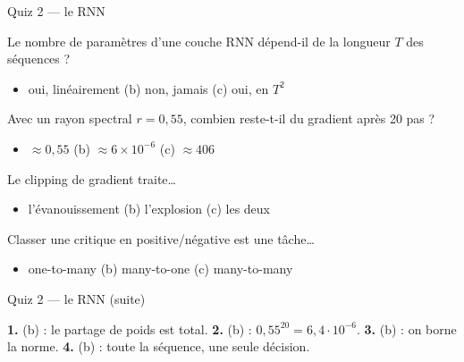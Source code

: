 \begin{frame}{Quiz 2 --- le RNN}
\begin{qbox}[Question 1]
Le nombre de paramètres d'une couche RNN dépend-il de la longueur $T$ des séquences ?
\begin{itemize}
  \item[(a)] oui, linéairement \quad (b) non, jamais \quad (c) oui, en $T^2$
\end{itemize}
\end{qbox}
\begin{qbox}[Question 2]
Avec un rayon spectral $r = 0{,}55$, combien reste-t-il du gradient après 20 pas ?
\begin{itemize}
  \item[(a)] $\approx 0{,}55$ \quad (b) $\approx 6 \times 10^{-6}$
  \quad (c) $\approx 406$
\end{itemize}
\end{qbox}
\begin{qbox}[Question 3]
Le clipping de gradient traite…
\begin{itemize}
  \item[(a)] l'évanouissement \quad (b) l'explosion \quad (c) les deux
\end{itemize}
\end{qbox}
\begin{qbox}[Question 4]
Classer une critique en positive/négative est une tâche…
\begin{itemize}
  \item[(a)] one-to-many \quad (b) many-to-one \quad (c) many-to-many
\end{itemize}
\end{qbox}

\end{frame}
\begin{frame}{Quiz 2 --- le RNN (suite)}
\begin{solbox}[Réponses]
\textbf{1.} (b) : le partage de poids est total. \quad
\textbf{2.} (b) : $0{,}55^{20} = 6{,}4 \cdot 10^{-6}$. \quad
\textbf{3.} (b) : on borne la norme. \quad
\textbf{4.} (b) : toute la séquence, une seule décision.
\end{solbox}
\end{frame}

